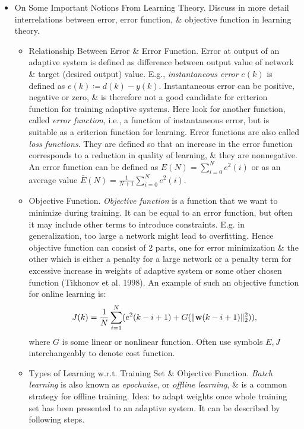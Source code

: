 \documentclass{article}
\begin{document}
\begin{enumerate}
\begin{itemize}
\begin{itemize}
			{\sf Extension to a General Neural Network.} When deriving a direct gradient algorithm for a general neural network, network architecture should be taken into account. For large networks for offline processing, classical backpropagation is the most convenient algorithm. However, for online learning, extensions of previous algorithm should be considered.
			\item {\sf On Some Important Notions From Learning Theory.} Discuss in more detail interrelations between error, error function, \& objective function in learning theory.
			\begin{itemize}
				\item {\sf Relationship Between Error \& Error Function.} Error at output of an adaptive system is defined as difference between output value of network \& target (desired output) value. E.g., {\it instantaneous error} $e(k)$ is defined as $e(k)\coloneqq d(k) - y(k)$. Instantaneous error can be positive, negative or zero, \& is therefore not a good candidate for criterion function for training adaptive systems. Here look for another function, called {\it error function}, i.e., a function of instantaneous error, but is suitable as a criterion function for learning. Error functions are also called {\it loss functions}. They are defined so that an increase in the error function corresponds to a reduction in quality of learning, \& they are nonnegative. An error function can be defined as $E(N) = \sum_{i=0}^N e^2(i)$ or as an average value $\bar{E}(N) = \frac{1}{N + 1}\sum_{i=0}^N e^2(i)$.
				\item {\sf Objective Function.} {\it Objective function} is a function that we want to minimize during training. It can be equal to an error function, but often it may include other terms to introduce constraints. E.g. in generalization, too large a network might lead to overfitting. Hence objective function can consist of 2 parts, one for error minimization \& the other which is either a penalty for a large network or a penalty term for excessive increase in weights of adaptive system or some other chosen function (Tikhonov et al. 1998). An example of such an objective function for online learning is:
				\begin{equation}
					J(k) = \frac{1}{N}\sum_{i=1}^N (e^2(k - i + 1) + G(\|{\bf w}(k - i + 1)\|_2^2)),
				\end{equation}
				where $G$ is some linear or nonlinear function. Often use symbols $E,J$ interchangeably to denote cost function.
				\item {\sf Types of Learning w.r.t. Training Set \& Objective Function.} {\it Batch learning} is also known as {\it epochwise}, or {\it offline learning}, \& is a common strategy for offline training. Idea: to adapt weights once whole training set has been presented to an adaptive system. It can be described by following steps.

\end{itemize}
\end{itemize}
\end{itemize}
\end{enumerate}
\end{document}

